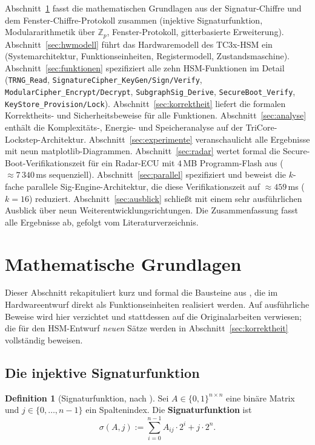 ﻿\documentclass[a4paper,12pt]{article}
\theoremstyle{definition}
\newtheorem{definition}{Definition}
\begin{document}
Abschnitt~\ref{sec:grundlagen} fasst die mathematischen Grundlagen aus der Signatur-Chiffre und dem Fenster-Chiffre-Protokoll zusammen (injektive Signaturfunktion, Modulararithmetik über $\mathbb{Z}_p$, Fenster-Protokoll, gitterbasierte Erweiterung). Abschnitt~\ref{sec:hwmodell} führt das Hardwaremodell des TC3x-HSM ein (Systemarchitektur, Funktionseinheiten, Registermodell, Zustandsmaschine). Abschnitt~\ref{sec:funktionen} spezifiziert alle zehn HSM-Funktionen im Detail (\texttt{TRNG\_Read}, \texttt{SignatureCipher\_KeyGen/Sign/Verify}, \texttt{ModularCipher\_Encrypt/Decrypt}, \texttt{SubgraphSig\_Derive}, \texttt{SecureBoot\_Verify}, \texttt{KeyStore\_Provision/Lock}). Abschnitt~\ref{sec:korrektheit} liefert die formalen Korrektheits- und Sicherheitsbeweise für alle Funktionen. Abschnitt~\ref{sec:analyse} enthält die Komplexitäts-, Energie- und Speicheranalyse auf der TriCore-Lockstep-Architektur. Abschnitt~\ref{sec:experimente} veranschaulicht alle Ergebnisse mit neun matplotlib-Diagrammen. Abschnitt~\ref{sec:radar} wertet formal die Secure-Boot-Verifikationszeit für ein Radar-ECU mit $4$\,MB Programm-Flash aus ($\approx 7\,340$\,ms sequenziell). Abschnitt~\ref{sec:parallel} spezifiziert und beweist die $k$-fache parallele Sig-Engine-Architektur, die diese Verifikationszeit auf $\approx 459$\,ms ($k=16$) reduziert. Abschnitt~\ref{sec:ausblick} schließt mit einem sehr ausführlichen Ausblick über neun Weiterentwicklungsrichtungen. Die Zusammenfassung fasst alle Ergebnisse ab, gefolgt vom Literaturverzeichnis.


\section{Mathematische Grundlagen}
\label{sec:grundlagen}

Dieser Abschnitt rekapituliert kurz und formal die Bausteine aus \cite{Epp26b,Epp26c,Epp26a}, die im Hardwareentwurf direkt als Funktionseinheiten realisiert werden. Auf ausführliche Beweise wird hier verzichtet und stattdessen auf die Originalarbeiten verwiesen; die für den HSM-Entwurf \emph{neuen} Sätze werden in Abschnitt~\ref{sec:korrektheit} vollständig beweisen.

\subsection{Die injektive Signaturfunktion}

\begin{definition}[Signaturfunktion, nach \cite{Epp26a,Epp26b}]
	\label{def:sigma}
	Sei $A \in \{0,1\}^{n \times n}$ eine binäre Matrix und $j \in \{0,\ldots,n-1\}$ ein Spaltenindex. Die \textbf{Signaturfunktion} ist
	\[
	\sigma(A, j) := \sum_{i=0}^{n-1} A_{ij} \cdot 2^i + j \cdot 2^n.
	\]
\end{definition}
\end{document}
